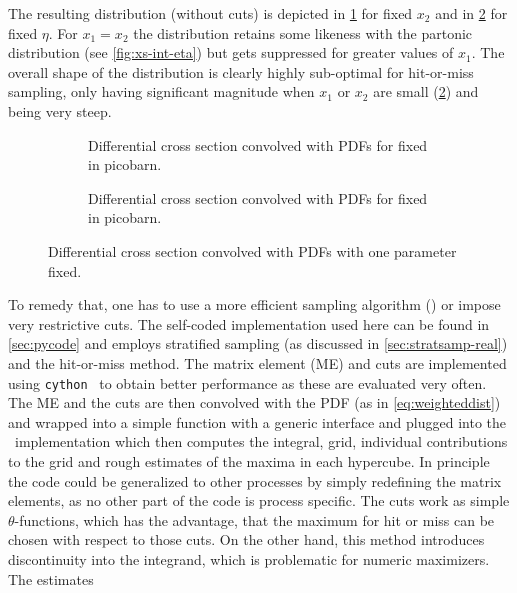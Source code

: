 The resulting distribution (without cuts) is depicted in
\cref{fig:dist-pdf} for fixed \(x_2\) and in
\cref{fig:dist-pdf-fixed-eta} for fixed \(\eta\). For \(x_1 = x_2\)
the distribution retains some likeness with the partonic distribution
(see \cref{fig:xs-int-eta}) but gets suppressed for greater values of
\(x_1\). The overall shape of the distribution is clearly highly
sub-optimal for hit-or-miss sampling, only having significant magnitude
when \(x_1\) or \(x_2\) are small (\cref{fig:dist-pdf-fixed-eta}) and
being very steep.
%
\begin{figure}[ht]
  \centering
  \begin{subfigure}{1\textwidth}
    \centering {}
    \caption{\label{fig:dist-pdf}Differential cross section convolved
      with PDFs for fixed \protect {} in
      picobarn.}
  \end{subfigure}
%
  \begin{subfigure}{1\textwidth}
    \centering {}
    \caption{\label{fig:dist-pdf-fixed-eta}Differential cross section
      convolved with PDFs for fixed \protect
       in picobarn.}
  \end{subfigure}
  \caption{\label{fig:dist-pdf-3d}Differential cross section
    convolved with PDFs with one parameter fixed.}
\end{figure}
%
To remedy that, one has to use a more efficient sampling algorithm
(\vegas) or impose very restrictive cuts. The self-coded
implementation used here can be found in \cref{sec:pycode} and employs
stratified sampling (as discussed in \cref{sec:stratsamp-real}) and
the hit-or-miss method. The matrix element (ME) and cuts are
implemented using \texttt{cython}~\cite{behnel2011:cy} to obtain
better performance as these are evaluated very often. The ME and the
cuts are then convolved with the PDF (as in \cref{eq:weighteddist})
and wrapped into a simple function with a generic interface and
plugged into the \vegas\ implementation which then computes the
integral, grid, individual contributions to the grid and rough
estimates of the maxima in each hypercube. In principle the code could
be generalized to other processes by simply redefining the matrix
elements, as no other part of the code is process specific. The cuts
work as simple \(\theta\)-functions, which has the advantage, that the
maximum for hit or miss can be chosen with respect to those cuts. On
the other hand, this method introduces discontinuity into the
integrand, which is problematic for numeric maximizers.  The estimates
